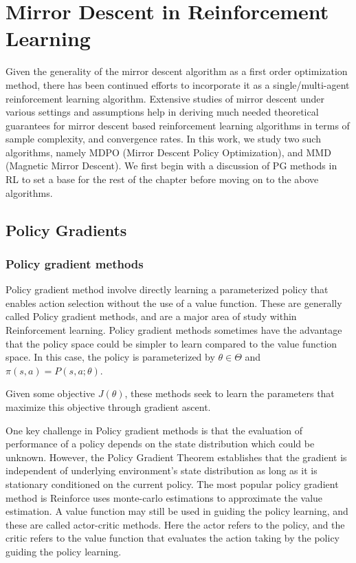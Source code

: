 \chapter{Mirror Descent in Reinforcement Learning}

Given the generality of the mirror descent algorithm as a first order optimization method, there
has been continued efforts to incorporate it as a single/multi-agent reinforcement learning
algorithm.
Extensive studies of mirror descent under various settings and assumptions help in deriving much
needed theoretical guarantees for mirror descent based reinforcement learning algorithms in terms
of sample complexity, and convergence rates.
In this work, we study two such algorithms, namely MDPO (Mirror Descent Policy Optimization), and
MMD (Magnetic Mirror Descent).
We first begin with a discussion of PG methods in RL to set a base for the rest of the chapter
before moving on to the above algorithms.


\section{Policy Gradients}

\label{sec:spg} \subsection{Policy gradient methods}\label{sec:pg}

Policy gradient method involve directly learning a parameterized policy that enables action
selection without the use of a value function.
These are generally called Policy gradient methods, and are a major area of study within
Reinforcement learning.
Policy gradient methods sometimes have the advantage that the policy space could be simpler to
learn compared to the value function space.
In this case, the policy is parameterized by $\theta \in \Theta$ and $\pi(s, a) = P(s, a; \theta)$.

Given some objective $J(\theta)$, these methods seek to learn the parameters that maximize this
objective through gradient ascent.

One key challenge in Policy gradient methods is that the evaluation of performance of a policy
depends on the state distribution which could be unknown.
However, the Policy Gradient Theorem establishes that the gradient is independent of underlying
environment's state distribution as long as it is stationary conditioned on the current policy.
The most popular policy gradient method is Reinforce uses monte-carlo estimations to approximate
the value estimation.
A value function may still be used in guiding the policy learning, and these are called
actor-critic methods.
Here the actor refers to the policy, and the critic refers to the value function that evaluates the
action taking by the policy guiding the policy learning.

